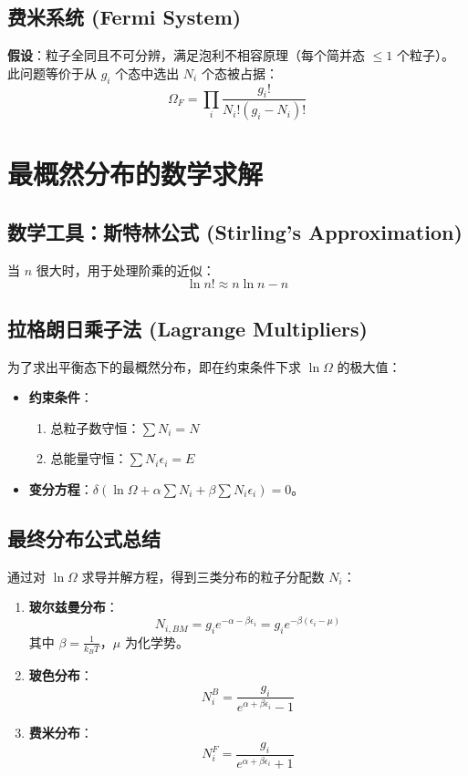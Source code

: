 \documentclass{article}
\begin{document}
\subsection{费米系统 (Fermi System)}
\textbf{假设}：粒子全同且不可分辨，满足泡利不相容原理（每个简并态 $\le 1$ 个粒子）。
此问题等价于从 $g_i$ 个态中选出 $N_i$ 个态被占据：
\[ \Omega_F = \prod_i \frac{g_i!}{N_i! (g_i - N_i)!} \]

\section{最概然分布的数学求解}

\subsection{数学工具：斯特林公式 (Stirling's Approximation)}
当 $n$ 很大时，用于处理阶乘的近似：
\[ \ln n! \approx n \ln n - n \]

\subsection{拉格朗日乘子法 (Lagrange Multipliers)}
为了求出平衡态下的最概然分布，即在约束条件下求 $\ln \Omega$ 的极大值：
\begin{itemize}
    \item \textbf{约束条件}：
    \begin{enumerate}
        \item 总粒子数守恒：$\sum N_i = N$
        \item 总能量守恒：$\sum N_i \epsilon_i = E$
    \end{enumerate}
    \item \textbf{变分方程}：$\delta(\ln \Omega + \alpha \sum N_i + \beta \sum N_i \epsilon_i) = 0$。
\end{itemize}

\subsection{最终分布公式总结}
通过对 $\ln \Omega$ 求导并解方程，得到三类分布的粒子分配数 $N_i$：

\begin{enumerate}
    \item \textbf{玻尔兹曼分布}：
    \[ N_{i,BM} = g_i e^{-\alpha - \beta \epsilon_i} = g_i e^{-\beta(\epsilon_i - \mu)} \]
    其中 $\beta = \frac{1}{k_B T}$，$\mu$ 为化学势。
    \item \textbf{玻色分布}：
    \[ N_i^B = \frac{g_i}{e^{\alpha + \beta \epsilon_i} - 1} \]
    \item \textbf{费米分布}：
    \[ N_i^F = \frac{g_i}{e^{\alpha + \beta \epsilon_i} + 1} \]
\end{enumerate}
\end{document}
